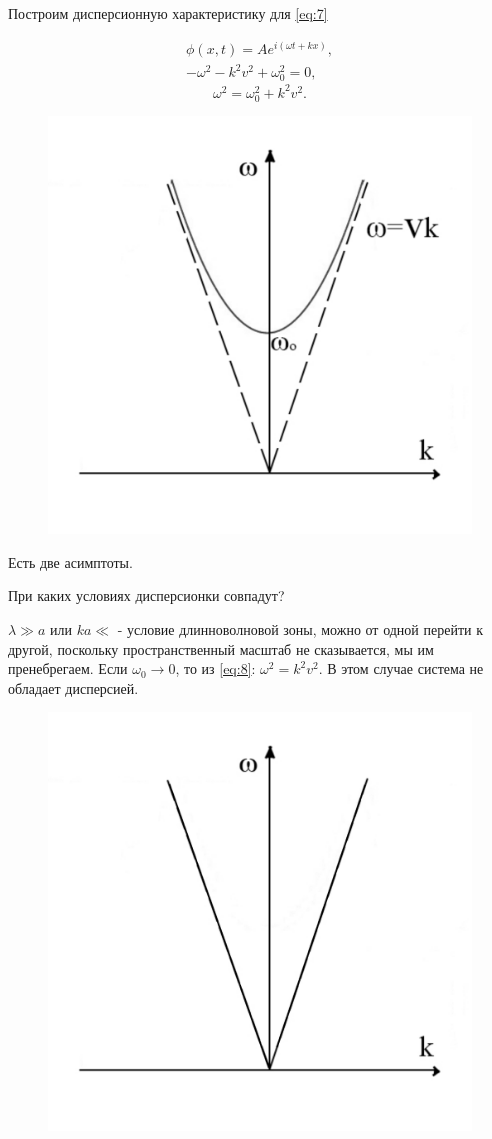 Построим дисперсионную характеристику для \eqref{eq:7}

\begin{gather*}
	\phi(x,t)=Ae^{i(\omega t + kx)}, \\ -\omega^2-k^2v^2+\omega_0^2=0,
\end{gather*}
\begin{equation}
	\omega^2 = \omega_0^2 + k^2v^2.
	\label{eq:8}
\end{equation}
\begin{figure}[H]
	\centering
	\includegraphics[width=0.5\linewidth]{fig/fig3.pdf}   
\end{figure}

Есть две асимптоты. 

При каких условиях дисперсионки совпадут?

$\lambda\gg a$ или $ka\ll$ - условие длинноволновой зоны, можно от одной перейти к другой, поскольку пространственный масштаб не сказывается, мы им пренебрегаем. Если $\omega_0 \rightarrow 0$, то из \eqref{eq:8}: $\omega^2=k^2v^2$. В этом случае система не обладает дисперсией. 

\begin{figure}[H]
	\centering
	\includegraphics[width=0.5\linewidth]{fig/fig4.pdf}   
\end{figure}

